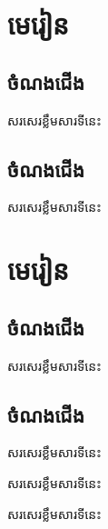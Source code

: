\documentclass[12pt,a4paper]{fancy}
\begin{document}
	\tableofcontents
	\chapter{មេរៀន}
	\section{ចំណងជើង}
	\begin{definition}
		សរសេរខ្លឹមសារទីនេះ
	\end{definition}
	\section{ចំណងជើង}
	\begin{example}
		សរសេរខ្លឹមសារទីនេះ
	\end{example}
	\chapter{មេរៀន}
	\section{ចំណងជើង}
	\begin{generality}
		សរសេរខ្លឹមសារទីនេះ
	\end{generality}
	\section{ចំណងជើង}
	\begin{property}
		សរសេរខ្លឹមសារទីនេះ
	\end{property}
	\begin{remark}
		សរសេរខ្លឹមសារទីនេះ
	\end{remark}
	\begin{exercise}
		សរសេរខ្លឹមសារទីនេះ
	\end{exercise}
\end{document}
